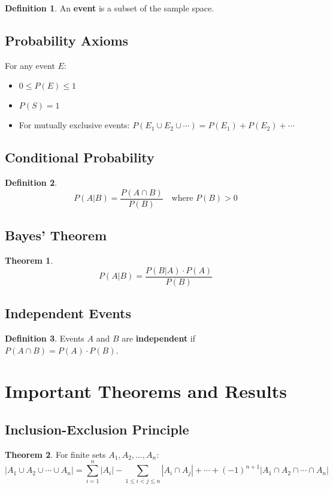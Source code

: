 \documentclass[11pt]{article}
\theoremstyle{definition}
\newtheorem{definition}{Definition}[section]
\newtheorem{theorem}{Theorem}[section]
\begin{document}
\begin{definition}
An \textbf{event} is a subset of the sample space.
\end{definition}

\subsection{Probability Axioms}
For any event $E$:
\begin{itemize}
    \item $0 \leq P(E) \leq 1$
    \item $P(S) = 1$
    \item For mutually exclusive events: $P(E_1 \cup E_2 \cup \cdots) = P(E_1) + P(E_2) + \cdots$
\end{itemize}

\subsection{Conditional Probability}
\begin{definition}
$$P(A|B) = \frac{P(A \cap B)}{P(B)} \quad \text{where } P(B) > 0$$
\end{definition}

\subsection{Bayes' Theorem}
\begin{theorem}
$$P(A|B) = \frac{P(B|A) \cdot P(A)}{P(B)}$$
\end{theorem}

\subsection{Independent Events}
\begin{definition}
Events $A$ and $B$ are \textbf{independent} if $P(A \cap B) = P(A) \cdot P(B)$.
\end{definition}

\section{Important Theorems and Results}

\subsection{Inclusion-Exclusion Principle}
\begin{theorem}
For finite sets $A_1, A_2, \ldots, A_n$:
$$|A_1 \cup A_2 \cup \cdots \cup A_n| = \sum_{i=1}^{n} |A_i| - \sum_{1 \leq i < j \leq n} |A_i \cap A_j| + \cdots + (-1)^{n+1} |A_1 \cap A_2 \cap \cdots \cap A_n|$$
\end{theorem}
\end{document}
